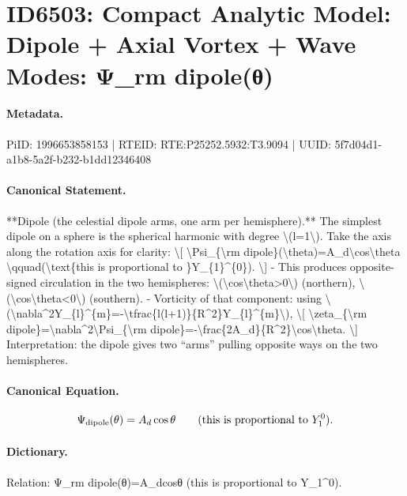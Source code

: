 \section*{ID6503: Compact Analytic Model: Dipole + Axial Vortex + Wave Modes: Ψ\_rm dipole(θ)}
\paragraph{Metadata.}
PiID: 1996653858153 | RTEID: RTE:P25252.5932:T3.9094 | UUID: 5f7d04d1-a1b8-5a2f-b232-b1dd12346408

\paragraph{Canonical Statement.}
**Dipole (the celestial dipole arms, one arm per hemisphere).** The simplest dipole on a sphere is the spherical harmonic with degree \textbackslash{}(l=1\textbackslash{}). Take the axis along the rotation axis for clarity: \textbackslash{}[ \textbackslash{}Psi\_\{\textbackslash{}rm dipole\}(\textbackslash{}theta)=A\_d\textbackslash{}cos\textbackslash{}theta \textbackslash{}qquad(\textbackslash{}text\{this is proportional to \}Y\_\{1\}\textasciicircum{}\{0\}). \textbackslash{}] - This produces opposite-signed circulation in the two hemispheres: \textbackslash{}(\textbackslash{}cos\textbackslash{}theta>0\textbackslash{}) (northern), \textbackslash{}(\textbackslash{}cos\textbackslash{}theta<0\textbackslash{}) (southern). - Vorticity of that component: using \textbackslash{}(\textbackslash{}nabla\textasciicircum{}2Y\_\{l\}\textasciicircum{}\{m\}=-\textbackslash{}tfrac\{l(l+1)\}\{R\textasciicircum{}2\}Y\_\{l\}\textasciicircum{}\{m\}\textbackslash{}), \textbackslash{}[ \textbackslash{}zeta\_\{\textbackslash{}rm dipole\}=\textbackslash{}nabla\textasciicircum{}2\textbackslash{}Psi\_\{\textbackslash{}rm dipole\}=-\textbackslash{}frac\{2A\_d\}\{R\textasciicircum{}2\}\textbackslash{}cos\textbackslash{}theta. \textbackslash{}] Interpretation: the dipole gives two “arms” pulling opposite ways on the two hemispheres.

\paragraph{Canonical Equation.}
\[
\Psi_{\rm dipole}(\theta)=A_d\cos\theta \qquad(\text{this is proportional to }Y_{1}^{0}).
\]

\paragraph{Dictionary.}
Relation: Ψ\_rm dipole(θ)=A\_dcosθ (this is proportional to Y\_1\textasciicircum{}0).

